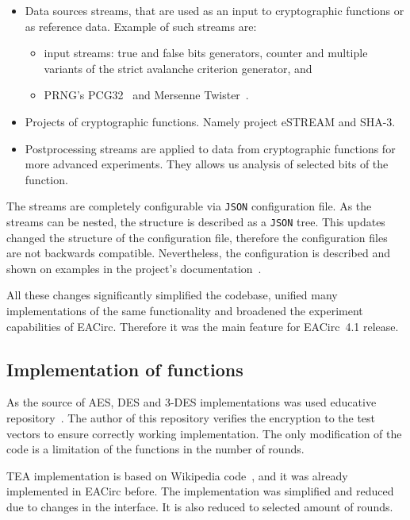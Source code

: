 \documentclass[
  print, %
  Table,   %
  nolof,     %
  nolot,     %
  11pt, %
  oneside  %
]{fithesis3}
\begin{document}
\begin{itemize}
    \item Data sources streams, that are used as an input to cryptographic functions or as reference data. Example of such streams are:
    \begin{itemize}
        \item input streams: true and false bits generators, counter and multiple variants of the strict avalanche criterion generator, and
        \item PRNG's PCG32~\cite{pcgGen} and Mersenne Twister~\cite{matsumoto1998mersenne}.
    \end{itemize}
    \item Projects of cryptographic functions. Namely project eSTREAM and SHA-3.
    \item Postprocessing streams are applied to data from cryptographic functions for more advanced experiments. They allows us analysis of selected bits of the function.
\end{itemize}

The streams are completely configurable via \texttt{JSON} configuration file. As the streams can be nested, the structure is described as a \texttt{JSON} tree. This updates changed the structure of the configuration file, therefore the configuration files are not backwards compatible. Nevertheless, the configuration is described and shown on examples in the project's documentation~\cite{EACirc-wiki-streams}.

All these changes significantly simplified the codebase, unified many implementations of the same functionality and broadened the experiment capabilities of EACirc. Therefore it was the main feature for EACirc~4.1 release.

\subsection{Implementation of functions}
\label{subsec:method-data-funcs}

As the source of AES, DES and 3-DES implementations was used educative repository~\cite{cryptoFunc}. The author of this repository verifies the encryption to the test vectors to ensure correctly working implementation. The only modification of the code is a limitation of the functions in the number of rounds.

TEA implementation is based on Wikipedia code~\cite{teaWiki}, and it was already implemented in EACirc before. The implementation was simplified and reduced due to changes in the interface. It is also reduced to selected amount of rounds.
\end{document}
